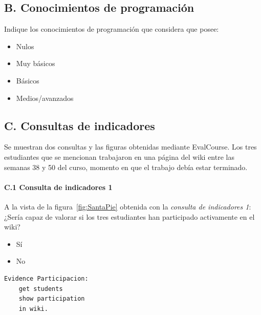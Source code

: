 	\subsection*{B. Conocimientos de programación}

\begin{mdframed}[style=cuestionarioST]
			Indique los conocimientos de programación que considera que posee:
			\begin{itemize}
				\item Nulos
				\item Muy básicos
				\item Básicos
				\item Medios/avanzados
			\end{itemize}
\end{mdframed}

	

	\subsection*{C. Consultas de indicadores}

\begin{mdframed}[style=cuestionarioST]
	Se muestran dos consultas y las figuras obtenidas mediante EvalCourse. Los tres estudiantes que se mencionan trabajaron en una página del wiki entre las semanas 38 y 50 del curso, momento en que el trabajo debía estar terminado.
\end{mdframed}

\newpage

	\paragraph*{C.1 Consulta de indicadores 1}

\begin{mdframed}[style=cuestionarioST]
			A la vista de la figura~\ref{fig:SantaPie} obtenida con la \emph{consulta de indicadores 1}: ¿Sería capaz de valorar si los tres estudiantes han participado activamente en el wiki?
			\begin{itemize}
				\item Sí
				\item No
			\end{itemize}

\begin{verbatim}
Evidence Participacion: 
	get students 
	show participation 
	in wiki.
\end{verbatim}
\end{mdframed}

